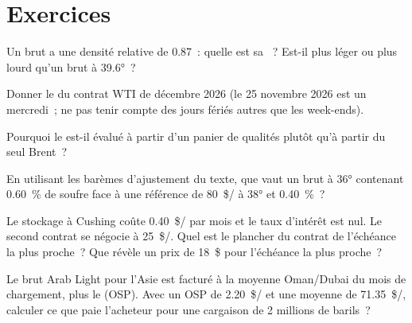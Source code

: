 \section{Exercices}

\begin{exercise}[$\star$]\label{exo:m3:crude-oil:1}
Un brut a une densité relative de 0.87~: quelle est sa ~? Est-il plus léger ou plus
lourd qu'un brut à 39.6°~?
\end{exercise}

\begin{exercise}[$\star$]\label{exo:m3:crude-oil:2}
Donner le  du contrat WTI de décembre 2026 (le 25 novembre 2026 est
un mercredi~; ne pas tenir compte des jours fériés autres que les week-ends).
\end{exercise}

\begin{exercise}[$\star$]\label{exo:m3:crude-oil:3}
Pourquoi le  est-il évalué à partir d'un panier de qualités plutôt qu'à partir du seul Brent~?
\end{exercise}

\begin{exercise}[$\star\star$]\label{exo:m3:crude-oil:4}
En utilisant les barèmes d'ajustement du texte, que vaut un brut à 36° contenant 0.60~\% de soufre
face à une référence de \qty{80}{\$/\barrel} à 38° et 0.40~\%~?
\end{exercise}

\begin{exercise}[$\star\star$]\label{exo:m3:crude-oil:5}
Le stockage à Cushing coûte \qty{0.40}{\$/\barrel} par mois et le taux d'intérêt est nul. Le second
contrat se négocie à \qty{25}{\$/\barrel}. Quel est le plancher du contrat de l'échéance la plus proche~?
Que révèle un prix de 18~\$ pour l'échéance la plus proche~?
\end{exercise}

\begin{exercise}[$\star\star$]\label{exo:m3:crude-oil:6}
Le brut Arab Light pour l'Asie est facturé à la moyenne Oman/Dubai du mois de chargement, plus
le  (OSP). Avec un OSP de \qty{2.20}{\$/\barrel} et une moyenne de \qty{71.35}{\$/\barrel}, calculer
ce que paie l'acheteur pour une cargaison de 2 millions de barils~?
\end{exercise}

